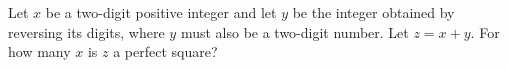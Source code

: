 Let $x$ be a two-digit positive integer and let $y$ be the integer obtained by reversing its digits, where $y$ must also be a two-digit number. Let $z=x+y$. For how many $x$ is $z$ a perfect square?
